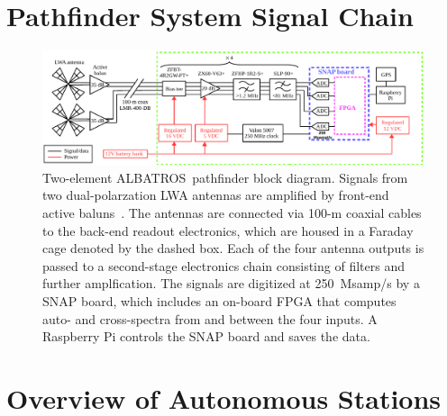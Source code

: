 \documentclass[12pt,a4paper]{report}
\def\albatros{ALBATROS}
\begin{document}
    \section{Pathfinder System Signal Chain}
	    \begin{figure}
	    	\begin{center} \includegraphics[width=\linewidth]{Figures/pathfinder_schematic.pdf}
	    		\caption{Two-element \albatros\ pathfinder block diagram.  Signals
	    			from two dual-polarzation LWA antennas are amplified by
	    			front-end active baluns~\citep{2012PASP..124.1090H}.  The
	    			antennas are connected via 100-m coaxial cables to the back-end readout electronics, which are housed in a Faraday cage denoted by the dashed box.  Each of the four antenna outputs is passed to a second-stage electronics chain consisting of filters and	further amplfication.  The signals are digitized at 250~Msamp/s by a SNAP board, which includes an on-board FPGA that computes
	    			auto- and cross-spectra from and between the four inputs.  A Raspberry Pi controls the SNAP board and saves the data.}
	    		\label{Fig:albatros2_schem}
	    	\end{center}
	    \end{figure}
   
        \subsection{}
        \subsection{}
        \subsection{}
        \subsection{}
        
        
\newpage
    \section{Overview of Autonomous Stations}
\end{document}
